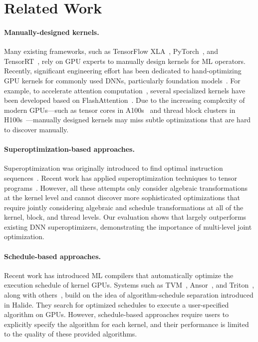 \section{Related Work}
\label{sec:related}

\paragraph{Manually-designed kernels.} Many existing frameworks, such as TensorFlow XLA~\cite{tensorflow_xla, Tensorflow}, PyTorch~\cite{pytorch}, and TensorRT~\cite{tensorrt}, rely on GPU experts to manually design kernels for ML operators.
%
Recently, significant engineering effort has been dedicated to hand-optimizing GPU kernels for commonly used DNNs, particularly foundation models~\cite{bommasani2022opportunities}.
For example, to accelerate attention computation~\cite{transformers}, several specialized kernels have been developed based on FlashAttention~\cite{dao2023flash, tri2023flashdecoding, hong2024flashdecoding, fastertransformer}. 
Due to the increasing complexity of modern GPUs---such as tensor cores in A100s~\cite{Markidis2018tensorcores} and thread block clusters in H100s~\cite{nvidia-h100}---manually designed kernels may miss subtle optimizations that are hard to discover manually.


\paragraph{Superoptimization-based approaches.} Superoptimization was originally introduced to find optimal instruction sequences~\cite{massalin, stoke, peephole}. 
%
Recent work has applied superoptimization techniques to tensor programs~\cite{TASO, wang2021pet, zheng2023einnet, tensat, unger2022unity, FlexFlow, hu2024korch, jeon2025graphpipe}.
%
However, all these attempts only consider algebraic transformations at the kernel level and cannot discover more sophisticated optimizations that require jointly considering algebraic and schedule transformations at all of the kernel, block, and thread levels.
Our evaluation shows that \sys largely outperforms existing DNN superoptimizers, demonstrating the importance of multi-level joint optimization.

\paragraph{Schedule-based approaches.} Recent work has introduced ML compilers that automatically optimize the execution schedule of kernel GPUs. Systems such as TVM~\cite{tvm, tvm_auto_tuner}, Ansor~\cite{ansor}, and Triton~\cite{tillet2019triton}, along with others~\cite{zheng2020flextensor, hagedorn2023graphene, feng2022tensorir}, build on the idea of algorithm-schedule separation introduced in Halide. They search for optimized schedules to execute a user-specified algorithm on GPUs.
However, schedule-based approaches require users to explicitly specify the algorithm for each kernel, and their performance is limited to the quality of these provided algorithms.

